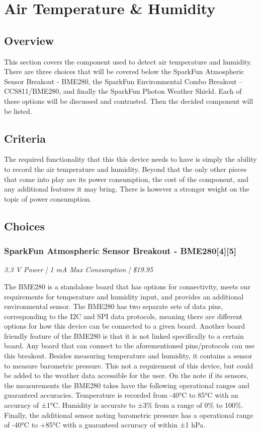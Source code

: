 \documentclass[IEEEtran,letterpaper,10pt,titlepage,fleqn,draftclsnofoot,onecolumn]{article}
\begin{document}
\section{Air Temperature \& Humidity}
\subsection{Overview}

This section covers the component used to detect air temperature and humidity. There are three choices that will be covered below the SparkFun Atmospheric Sensor Breakout - BME280, the SparkFun Environmental Combo Breakout – CCS811/BME280, and finally the SparkFun Photon Weather Shield. Each of these options will be discussed and contrasted. Then the decided component will be listed.  

\subsection{Criteria}

The required functionality that this this device needs to have is simply the ability to record the air temperature and humidity. Beyond that the only other pieces that come into play are its power consumption, the cost of the component, and any additional features it may bring. There is however a stronger weight on the topic of power consumption.

\subsection{Choices}
\subsubsection{SparkFun Atmospheric Sensor Breakout - BME280[4][5]}
\textit{3.3 V Power | 1 mA Max Consumption | \$19.95}

\vspace{1mm}

The BME280 is a standalone board that has options for connectivity, meets our requirements for temperature and humidity input, and provides an additional environmental sensor. The BME280 has two separate sets of data pins, corresponding to the I2C and SPI data protocols, meaning there are different options for how this device can be connected to a given board. Another board friendly feature of the BME280 is that it is not linked specifically to a certain board. Any board that can connect to the aforementioned pins/protocols can use this breakout. Besides measuring temperature and humidity, it contains a sensor to measure barometric pressure. This not a requirement of this device, but could be added to the weather data accessible for the user. On the note if its sensors, the measurements the BME280 takes have the following operational ranges and guaranteed accuracies. Temperature is recorded from -40°C to 85°C with an accuracy of ±1°C. Humidity is accurate to ±3\% from a range of 0\% to 100\%. Finally, the additional sensor noting barometric pressure has a operational range of -40°C to +85°C with a guaranteed accuracy of within ±1 hPa.
\end{document}
